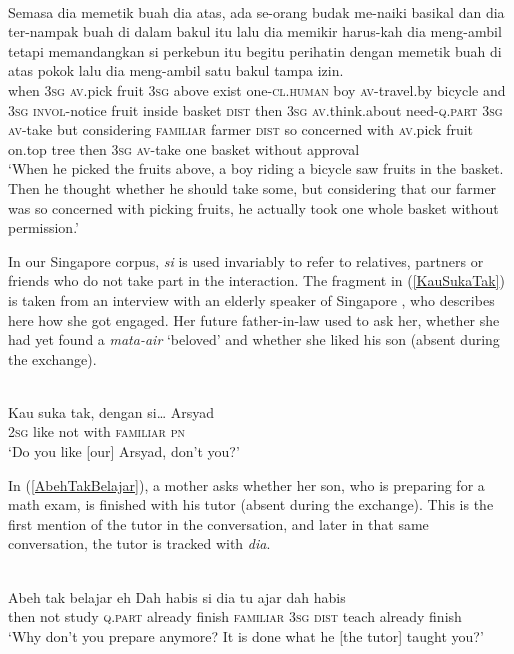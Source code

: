 \documentclass[output=paper
,modfonts
,nonflat]{langsci/langscibook}
\begin{document}
\ea\label{SemasaDiaMemetik} 
\\
\gll Semasa dia memetik buah  dia atas, ada      se-orang budak me-naiki basikal dan  dia ter-nampak buah  {di dalam} bakul  itu lalu    dia memikir harus-kah      dia meng-ambil tetapi memandangkan  {\ob}si   perkebun itu{\cb} begitu perihatin dengan memetik buah  {di atas} pokok lalu    dia meng-ambil satu bakul  tampa   izin.\\
when   \textsc{3sg} \textsc{av.}pick   fruit \textsc{3sg} above exist one-\textsc{cl.human}  boy   \textsc{av-}travel.by    bicycle and  \textsc{3sg} \textsc{invol-}notice    fruit inside   basket \textsc{dist} then \textsc{3sg} \textsc{av.}think.about need-\textsc{q.part} \textsc{3sg} \textsc{av-}take      but considering         \textsc{familiar} farmer   \textsc{dist} so concerned with   \textsc{av}.pick   fruit on.top tree  then \textsc{3sg} \textsc{av-}take      one  basket without approval\\
\glt `When he picked the fruits above, a boy riding a bicycle saw fruits in the basket. Then he thought whether he should take some, but considering that our farmer was so concerned with picking fruits, he actually took one whole basket without permission.'
\z

\noindent
In our Singapore  corpus, \emph{si} is used invariably to refer to relatives, partners or friends who do not take part in the interaction. The fragment in (\ref{KauSukaTak}) is taken from an interview with an elderly speaker of Singapore , who describes here how she got engaged. Her future father-in-law used to ask her, whether she had yet found a \emph{mata-air} `beloved' and whether she liked his son (absent during the exchange).

\ea\label{KauSukaTak} 
\\
\gll Kau suka tak, dengan {si\ldots} Arsyad{\USQMark}\\
\textsc{2sg}  like not  with   \textsc{familiar}   \textsc{pn}\\
\glt `Do you like [our] Arsyad, don't you?'
\z

\noindent
In (\ref{AbehTakBelajar}), a mother asks whether her son, who is preparing for a math exam,  is finished with his tutor (absent during the exchange). This is the first mention of the tutor in the conversation, and later in that same conversation, the tutor is tracked with \emph{dia}.

\ea\label{AbehTakBelajar} 
\\
\gll Abeh tak belajar eh{\USQMark} Dah     habis   {\ob}si    dia tu{\cb}  ajar  dah     habis{\USQMark}\\
then not  study   \textsc{q.part} already finish \textsc{familiar}   \textsc{3sg} \textsc{dist} teach already finish\\
\glt `Why don't you prepare anymore? It is done what he [the tutor] taught you?'
\z
\end{document}
